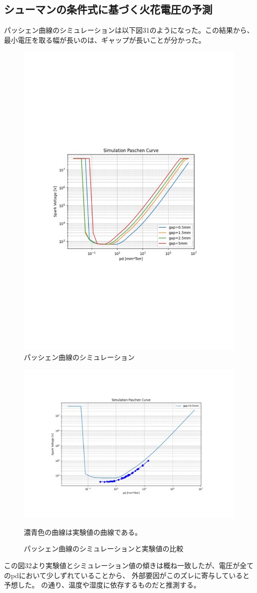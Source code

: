 \documentclass[a4j,twocolumn]{jsarticle}
\begin{document}
\subsection*{シューマンの条件式に基づく火花電圧の予測}

パッシェン曲線のシミュレーションは以下図31のようになった。この結果から、最小電圧を取る幅が長いのは、ギャップが長いことが分かった。

\begin{figure}[htb]
    \centering
    \includegraphics[keepaspectratio,width=0.6\columnwidth]{fig/paschen_curve.pdf}
    \caption{パッシェン曲線のシミュレーション}
\end{figure}


\begin{figure}[htb]
    \centering
    \includegraphics[keepaspectratio,width=0.6\columnwidth]{fig/paschen_curve1.pdf}
    \caption{パッシェン曲線のシミュレーションと実験値の比較}
    濃青色の曲線は実験値の曲線である。
\end{figure}

この図32より実験値とシミュレーション値の傾きは概ね一致したが、電圧が全てのpdにおいて少しずれていることから、
外部要因がこのズレに寄与していると予想した。
\cite{thesis}の通り、温度や湿度に依存するものだと推測する。
















\end{document}
